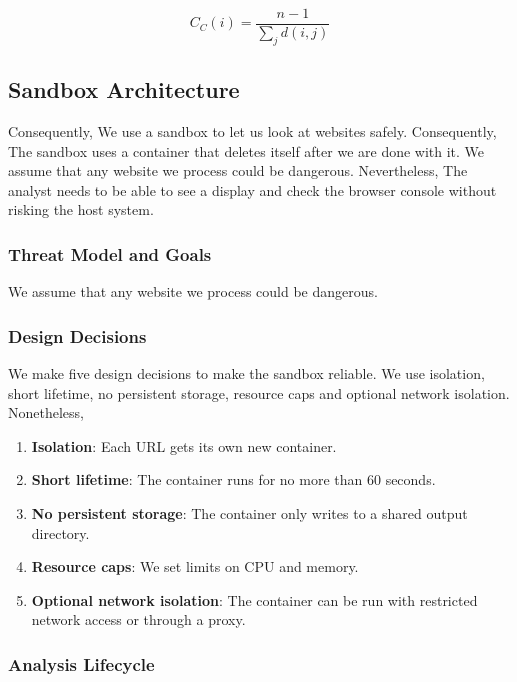 \documentclass[conference]{IEEEtran}
\begin{document}
\begin{equation}
C_C(i) = \frac{n-1}{\sum_{j} d(i,j)}
\label{eq:closeness}
\end{equation}

\subsection{Sandbox Architecture}

Consequently, We use a sandbox to let us look at websites safely. Consequently, The sandbox uses a container that deletes itself after we are done with it. We assume that any website we process could be dangerous. Nevertheless, The analyst needs to be able to see a display and check the browser console without risking the host system.

\subsubsection{Threat Model and Goals}

We assume that any website we process could be dangerous.

\subsubsection{Design Decisions}

We make five design decisions to make the sandbox reliable. We use isolation, short lifetime, no persistent storage, resource caps and optional network isolation. Nonetheless,

\begin{enumerate}
\item \textbf{Isolation}: Each URL gets its own new container.
\item \textbf{Short lifetime}: The container runs for no more than 60 seconds.
\item \textbf{No persistent storage}: The container only writes to a shared output directory.
\item \textbf{Resource caps}: We set limits on CPU and memory.
\item \textbf{Optional network isolation}: The container can be run with restricted network access or through a proxy.
\end{enumerate}

\subsubsection{Analysis Lifecycle}
\end{document}
